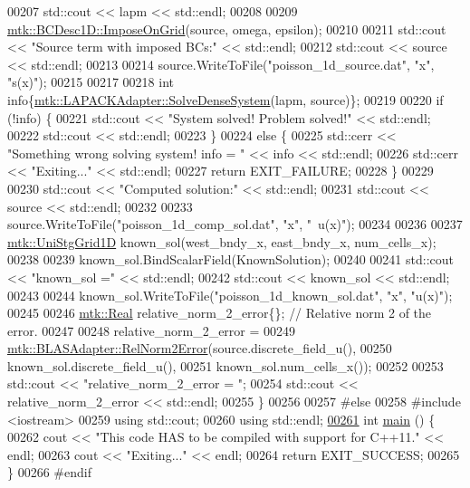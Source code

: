 \begin{DoxyCode}
00207   std::cout << lapm << std::endl;
00208 
00209   \hyperlink{classmtk_1_1BCDesc1D_a79a659c6a6333af8e51c463cf1ecb0b7}{mtk::BCDesc1D::ImposeOnGrid}(source, omega, epsilon);
00210 
00211   std::cout << \textcolor{stringliteral}{"Source term with imposed BCs:"} << std::endl;
00212   std::cout << source << std::endl;
00213 
00214   source.WriteToFile(\textcolor{stringliteral}{"poisson\_1d\_source.dat"}, \textcolor{stringliteral}{"x"}, \textcolor{stringliteral}{"s(x)"});
00215 
00217 
00218   \textcolor{keywordtype}{int} info\{\hyperlink{classmtk_1_1LAPACKAdapter_a7428bccf74fd4a4af68fb7233846da22}{mtk::LAPACKAdapter::SolveDenseSystem}(lapm, source)\};
00219 
00220   \textcolor{keywordflow}{if} (!info) \{
00221     std::cout << \textcolor{stringliteral}{"System solved! Problem solved!"} << std::endl;
00222     std::cout << std::endl;
00223   \}
00224   \textcolor{keywordflow}{else} \{
00225     std::cerr << \textcolor{stringliteral}{"Something wrong solving system! info = "} << info << std::endl;
00226     std::cerr << \textcolor{stringliteral}{"Exiting..."} << std::endl;
00227     \textcolor{keywordflow}{return} EXIT\_FAILURE;
00228   \}
00229 
00230   std::cout << \textcolor{stringliteral}{"Computed solution:"} << std::endl;
00231   std::cout << source << std::endl;
00232 
00233   source.WriteToFile(\textcolor{stringliteral}{"poisson\_1d\_comp\_sol.dat"}, \textcolor{stringliteral}{"x"}, \textcolor{stringliteral}{"~u(x)"});
00234 
00236 
00237   \hyperlink{classmtk_1_1UniStgGrid1D}{mtk::UniStgGrid1D} known\_sol(west\_bndy\_x, east\_bndy\_x, num\_cells\_x);
00238 
00239   known\_sol.BindScalarField(KnownSolution);
00240 
00241   std::cout << \textcolor{stringliteral}{"known\_sol ="} << std::endl;
00242   std::cout << known\_sol << std::endl;
00243 
00244   known\_sol.WriteToFile(\textcolor{stringliteral}{"poisson\_1d\_known\_sol.dat"}, \textcolor{stringliteral}{"x"}, \textcolor{stringliteral}{"u(x)"});
00245 
00246   \hyperlink{group__c01-roots_gac080bbbf5cbb5502c9f00405f894857d}{mtk::Real} relative\_norm\_2\_error\{\};  \textcolor{comment}{// Relative norm 2 of the error.}
00247 
00248   relative\_norm\_2\_error =
00249     \hyperlink{classmtk_1_1BLASAdapter_af2ac5691f45e67d6e26186b071119ec4}{mtk::BLASAdapter::RelNorm2Error}(source.discrete\_field\_u(),
00250                                     known\_sol.discrete\_field\_u(),
00251                                     known\_sol.num\_cells\_x());
00252 
00253   std::cout << \textcolor{stringliteral}{"relative\_norm\_2\_error = "};
00254   std::cout << relative\_norm\_2\_error << std::endl;
00255 \}
00256 
00257 \textcolor{preprocessor}{#else}
00258 \textcolor{preprocessor}{#include <iostream>}
00259 \textcolor{keyword}{using} std::cout;
00260 \textcolor{keyword}{using} std::endl;
\hypertarget{poisson__1d_8cc_source_l00261}{}\hyperlink{poisson__1d_8cc_ae66f6b31b5ad750f1fe042a706a4e3d4}{00261} \textcolor{keywordtype}{int} \hyperlink{poisson__1d_8cc_ae66f6b31b5ad750f1fe042a706a4e3d4}{main} () \{
00262   cout << \textcolor{stringliteral}{"This code HAS to be compiled with support for C++11."} << endl;
00263   cout << \textcolor{stringliteral}{"Exiting..."} << endl;
00264   \textcolor{keywordflow}{return} EXIT\_SUCCESS;
00265 \}
00266 \textcolor{preprocessor}{#endif}
\end{DoxyCode}
